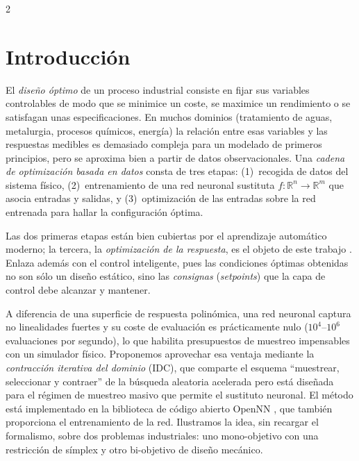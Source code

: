 \documentclass[5p,times,authoryear]{sciarticle}
\begin{document}
\begin{multicols}{2}

\section{Introducción}
El \emph{diseño óptimo} de un proceso industrial consiste en fijar sus
variables controlables de modo que se minimice un coste, se maximice un
rendimiento o se satisfagan unas especificaciones. En muchos dominios
(tratamiento de aguas, metalurgia, procesos químicos, energía) la relación
entre esas variables y las respuestas medibles es demasiado compleja para
un modelado de primeros principios, pero se aproxima bien a partir de datos
observacionales. Una \emph{cadena de optimización basada en datos} consta
de tres etapas: (1)~recogida de datos del sistema físico,
(2)~entrenamiento de una red neuronal sustituta $f\colon\mathbb{R}^n\to
\mathbb{R}^m$ que asocia entradas y salidas, y (3)~optimización de las
entradas sobre la red entrenada para hallar la configuración óptima.

Las dos primeras etapas están bien cubiertas por el aprendizaje automático
moderno; la tercera, la \emph{optimización de la respuesta}, es el objeto de
este trabajo \citep{Myers2016,Derringer1980}. Enlaza además con el control
inteligente, pues las condiciones óptimas obtenidas no son sólo un diseño
estático, sino las \emph{consignas} (\emph{setpoints}) que la capa de
control debe alcanzar y mantener.

A diferencia de una superficie de respuesta polinómica, una red neuronal
captura no linealidades fuertes y su coste de evaluación es prácticamente
nulo ($10^4$--$10^6$ evaluaciones por segundo), lo que habilita presupuestos
de muestreo impensables con un simulador físico. Proponemos aprovechar esa
ventaja mediante la \emph{contracción iterativa del dominio} (IDC), que
comparte el esquema ``muestrear, seleccionar y contraer'' de la búsqueda
aleatoria acelerada \citep{Appel2003} pero está diseñada para el régimen de
muestreo masivo que permite el sustituto neuronal. El método está
implementado en la biblioteca de código abierto OpenNN \citep{OpenNN2026},
que también proporciona el entrenamiento de la red. Ilustramos la idea, sin
recargar el formalismo, sobre dos problemas industriales: uno mono-objetivo
con una restricción de símplex y otro bi-objetivo de diseño mecánico.


\end{multicols}
\end{document}
